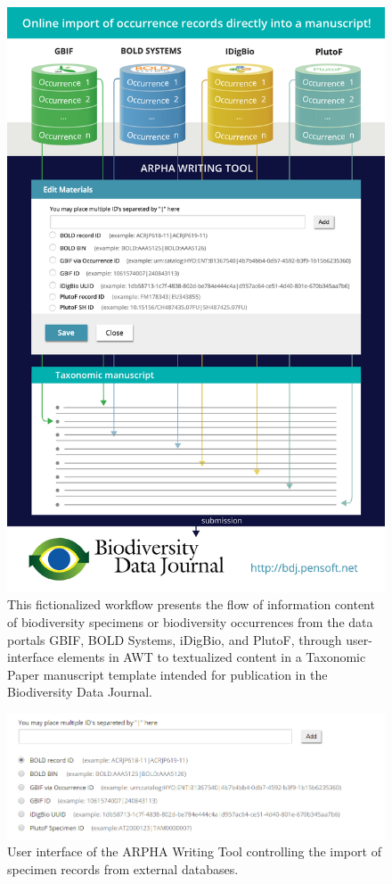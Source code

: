 \begin{figure}
\centering
\includegraphics[width=\textwidth]{Figures/workflow-idigbio}
\decoRule
\caption{This fictionalized workflow presents the flow of information content of biodiversity specimens or biodiversity occurrences from the data portals GBIF, BOLD Systems, iDigBio, and PlutoF, through user-interface elements in AWT to textualized content in a Taxonomic Paper manuscript template intended for publication in the Biodiversity Data Journal.}
\label{fig:workflow-idigbio}
\end{figure}

\begin{figure}
\centering
\includegraphics[width=\textwidth]{Figures/occurrence-input-mask}
\decoRule
\caption{User interface of the ARPHA Writing Tool controlling the import of specimen records from external databases.}
\label{fig:occurrence-input-mask}
\end{figure}

